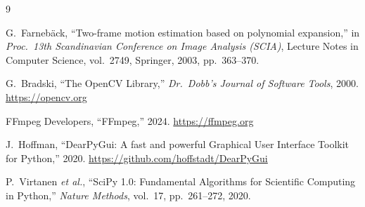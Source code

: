\documentclass[12pt,a4paper]{article}
\begin{document}

\begin{thebibliography}{9}

G.~Farneb\"{a}ck,
``Two-frame motion estimation based on polynomial expansion,''
in \emph{Proc.\ 13th Scandinavian Conference on Image Analysis (SCIA)},
Lecture Notes in Computer Science, vol.~2749,
Springer, 2003, pp.~363--370.

G.~Bradski,
``The OpenCV Library,''
\emph{Dr.\ Dobb's Journal of Software Tools}, 2000.
\url{https://opencv.org}

FFmpeg Developers,
``FFmpeg,'' 2024.
\url{https://ffmpeg.org}

J.~Hoffman,
``DearPyGui: A fast and powerful Graphical User Interface Toolkit for Python,''
2020.
\url{https://github.com/hoffstadt/DearPyGui}

P.~Virtanen \textit{et al.},
``SciPy 1.0: Fundamental Algorithms for Scientific Computing in Python,''
\emph{Nature Methods}, vol.~17, pp.~261--272, 2020.

\end{thebibliography}
\end{document}
